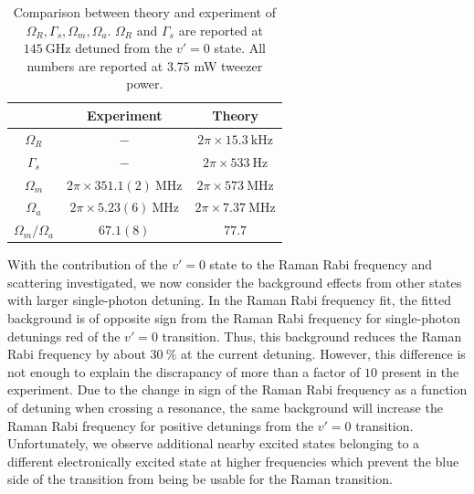 \documentclass[aps,prl,twocolumn,10pt,superscriptaddress]{revtex4-1}
\begin{document}
\begin{table}[ht]
  \centering
  \begin{tabular}{c|c|c}
    & Experiment & Theory \\ \hline
    $\Omega_R $ & $-$ & $2\pi \times 15.3~\mathrm{kHz}$ \\
    $\Gamma_s$ & $-$ & $ 2\pi \times 533~\mathrm{Hz}$ \\
    $\Omega_m$ & $2\pi \times 351.1(2)~\mathrm{MHz} $ & $2\pi \times 573 ~\mathrm{MHz}$ \\
    $\Omega_a$ & $2\pi \times 5.23(6)~\mathrm{MHz}$ & $2\pi \times 7.37 ~\mathrm{MHz}$ \\
    $\Omega_m/\Omega_a$ & $67.1(8)$ & $77.7$
  \end{tabular}
  \caption{Comparison between theory and experiment of $\Omega_R,\Gamma_s, \Omega_m, \Omega_a$. $\Omega_R$ and $ \Gamma_s $ are reported at $145~\mathrm{GHz}$ detuned from the $v' = 0$ state. All numbers are reported at $3.75$ mW tweezer power. }
  \label{tab:rabi_freqs}
\end{table}

With the contribution of the $ v' = 0 $ state to the Raman Rabi frequency and scattering investigated,
we now consider the background effects from other states with larger single-photon detuning.
In the Raman Rabi frequency fit,
the fitted background is of opposite sign from the Raman Rabi frequency
for single-photon detunings red of the $v' = 0 $ transition.
Thus, this background reduces the Raman Rabi frequency by about $30~\mathrm{\%}$
at the current detuning.
However, this difference is not enough to explain the discrapancy of more than a factor of $10$
present in the experiment.
Due to the change in sign of the Raman Rabi frequency as a function of detuning
when crossing a resonance, the same background will increase the Raman Rabi frequency
for positive detunings from the $v' = 0$ transition.
Unfortunately, we observe additional nearby excited states
belonging to a different electronically excited state at higher frequencies
which prevent the blue side of the transition from being be usable for the Raman transition.
\end{document}
